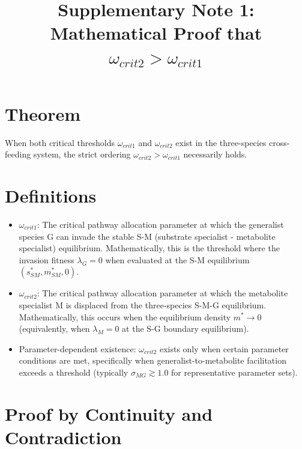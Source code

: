 \documentclass[11pt]{article}
\title{Supplementary Note 1: Mathematical Proof that $\omega_{crit2} > \omega_{crit1}$}
\author{}
\date{}
\begin{document}
\maketitle

\section*{Theorem}

When both critical thresholds $\omega_{crit1}$ and $\omega_{crit2}$ exist in the three-species cross-feeding system, the strict ordering $\omega_{crit2} > \omega_{crit1}$ necessarily holds.

\section*{Definitions}

\begin{itemize}
    \item $\omega_{crit1}$: The critical pathway allocation parameter at which the generalist species G can invade the stable S-M (substrate specialist - metabolite specialist) equilibrium. Mathematically, this is the threshold where the invasion fitness $\lambda_G = 0$ when evaluated at the S-M equilibrium $(s^*_{SM}, m^*_{SM}, 0)$.

    \item $\omega_{crit2}$: The critical pathway allocation parameter at which the metabolite specialist M is displaced from the three-species S-M-G equilibrium. Mathematically, this occurs when the equilibrium density $m^* \to 0$ (equivalently, when $\lambda_M = 0$ at the S-G boundary equilibrium).

    \item Parameter-dependent existence: $\omega_{crit2}$ exists only when certain parameter conditions are met, specifically when generalist-to-metabolite facilitation exceeds a threshold (typically $\sigma_{MG} \gtrsim 1.0$ for representative parameter sets).
\end{itemize}

\section*{Proof by Continuity and Contradiction}
\end{document}

